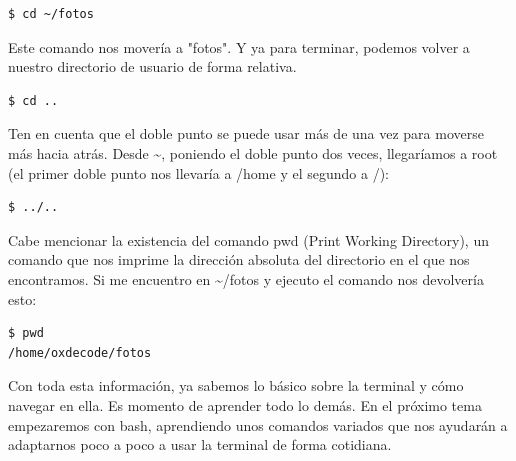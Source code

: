 \begin{tcolorbox-code}
\begin{lstlisting}
$ cd ~/fotos 
\end{lstlisting}
\end{tcolorbox-code}

Este comando nos movería a "fotos". Y ya para terminar, podemos volver a nuestro directorio de usuario de forma relativa.

\begin{tcolorbox-code}
\begin{lstlisting}
$ cd ..
\end{lstlisting}
\end{tcolorbox-code}

Ten en cuenta que el doble punto se puede usar más de una vez para moverse más hacia atrás. Desde \textasciitilde, poniendo el doble punto dos veces, llegaríamos a root (el primer doble punto nos llevaría a /home y el segundo a /):

\begin{tcolorbox-code}
\begin{lstlisting}
$ ../..
\end{lstlisting}
\end{tcolorbox-code}

Cabe mencionar la existencia del comando pwd (Print Working Directory), un comando que nos imprime la dirección absoluta del directorio en el que nos encontramos. Si me encuentro en \textasciitilde/fotos y ejecuto el comando nos devolvería esto:

\begin{tcolorbox-code}
\begin{lstlisting}
$ pwd
/home/oxdecode/fotos
\end{lstlisting}
\end{tcolorbox-code}

Con toda esta información, ya sabemos lo básico sobre la terminal y cómo navegar en ella. Es momento de aprender todo lo demás. En el próximo tema empezaremos con bash, aprendiendo unos comandos variados que nos ayudarán a adaptarnos poco a poco a usar la terminal de forma cotidiana.
